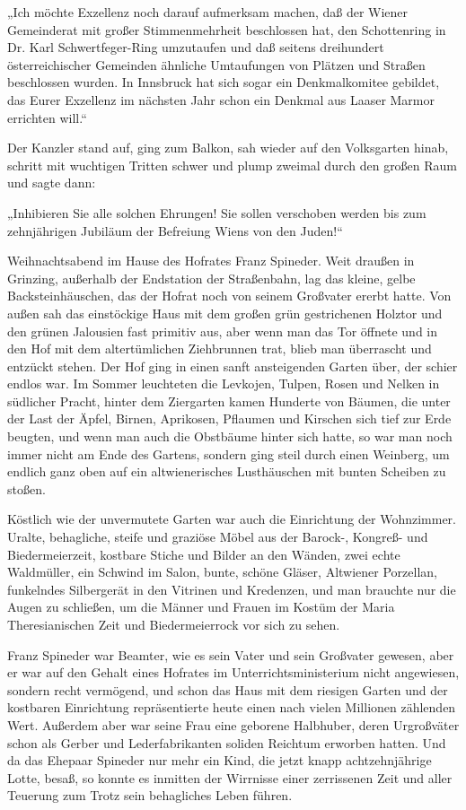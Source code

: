 „Ich möchte Exzellenz noch darauf aufmerksam machen, daß der Wiener
Gemeinderat mit großer Stimmenmehrheit beschlossen hat, den
Schottenring in Dr. Karl Schwertfeger-Ring umzutaufen und daß
seitens dreihundert österreichischer Gemeinden ähnliche Umtaufungen
von Plätzen und Straßen beschlossen wurden. In Innsbruck hat sich
sogar ein Denkmalkomitee gebildet, das Eurer Exzellenz im nächsten
Jahr schon ein Denkmal aus Laaser Marmor errichten will.“

Der Kanzler stand auf, ging zum Balkon, sah wieder auf den
Volksgarten hinab, schritt mit wuchtigen Tritten schwer und plump
zweimal durch den großen Raum und sagte dann:

„Inhibieren Sie alle solchen Ehrungen! Sie sollen verschoben werden
bis zum zehnjährigen Jubiläum der Befreiung Wiens von den Juden!“

\tb{* * *}
Weihnachtsabend im Hause des Hofrates Franz Spineder. Weit draußen
in Grinzing, außerhalb der Endstation der Straßenbahn, lag das
kleine, gelbe Backsteinhäuschen, das der Hofrat noch von seinem
Großvater ererbt hatte. Von außen sah das einstöckige Haus mit dem
großen grün gestrichenen Holztor und den grünen Jalousien fast
primitiv aus, aber wenn man das Tor öffnete und in den Hof mit dem
altertümlichen Ziehbrunnen trat,  blieb man
überrascht und entzückt stehen. Der Hof ging in einen sanft
ansteigenden Garten über, der schier endlos war. Im Sommer
leuchteten die Levkojen, Tulpen, Rosen und Nelken in südlicher
Pracht, hinter dem Ziergarten kamen Hunderte von Bäumen, die unter
der Last der Äpfel, Birnen, Aprikosen, Pflaumen und Kirschen sich
tief zur Erde beugten, und wenn man auch die Obstbäume hinter sich
hatte, so war man noch immer nicht am Ende des Gartens, sondern
ging steil durch einen Weinberg, um endlich ganz oben auf ein
altwienerisches Lusthäuschen mit bunten Scheiben zu stoßen.

Köstlich wie der unvermutete Garten war auch die Einrichtung der
Wohnzimmer. Uralte, behagliche, steife und graziöse Möbel aus der
Barock-, Kongreß- und Biedermeierzeit, kostbare Stiche und Bilder
an den Wänden, zwei echte Waldmüller, ein Schwind im Salon, bunte,
schöne Gläser, Altwiener Porzellan, funkelndes Silbergerät in den
Vitrinen und Kredenzen, und man brauchte nur die Augen zu
schließen, um die Männer und Frauen im Kostüm der Maria
Theresianischen Zeit und Biedermeierrock vor sich zu sehen.

Franz Spineder war Beamter, wie es sein Vater und sein Großvater
gewesen, aber er war auf den Gehalt eines Hofrates im
Unterrichtsministerium nicht angewiesen, sondern recht vermögend,
und schon das Haus mit dem riesigen Garten und der kostbaren
Einrichtung repräsentierte heute einen nach vielen Millionen
zählenden Wert. Außerdem aber war seine Frau eine geborene
Halbhuber, deren Urgroßväter schon als Gerber und Lederfabrikanten
soliden  Reichtum erworben hatten. Und da das
Ehepaar Spineder nur mehr ein Kind, die jetzt knapp achtzehnjährige
Lotte, besaß, so konnte es inmitten der Wirrnisse einer zerrissenen
Zeit und aller Teuerung zum Trotz sein behagliches Leben führen.

